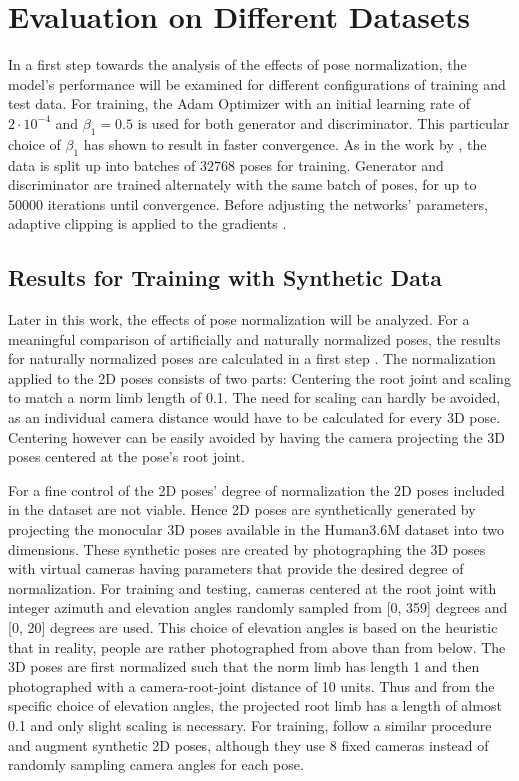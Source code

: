 \section{
	Evaluation on Different Datasets}
\label{sec:evaluation}

In a first step towards the analysis of the effects of pose normalization, the model's performance will be examined for different configurations of training and test data.
For training, the Adam Optimizer \cite{kingma17} with an initial learning rate of $2 \cdot 10^{-4}$ and $\beta_1 = 0.5$ is used for both generator and discriminator.
This particular choice of $\beta_1$ has shown to result in faster convergence.
As in the work by \citet{drover18}, the data is split up into batches of $32768$ poses for training.
Generator and discriminator are trained alternately with the same batch of poses, for up to $50000$ iterations until convergence.
Before adjusting the networks' parameters, adaptive clipping is applied to the gradients \cite[Section~3.2.1]{chorowski14}.


\subsection{Results for Training with Synthetic Data}

Later in this work, the effects of pose normalization will be analyzed.
For a meaningful comparison of artificially and naturally normalized poses, the results for naturally normalized poses are calculated in a first step .
The normalization applied to the 2D poses consists of two parts: Centering the root joint and scaling to match a norm limb length of 0.1.
The need for scaling can hardly be avoided, as an individual camera distance would have to be calculated for every 3D pose.
Centering however can be easily avoided by having the camera projecting the 3D poses centered at the pose's root joint.

For a fine control of the 2D poses' degree of normalization the 2D poses included in the dataset are not viable.
Hence 2D poses are synthetically generated by projecting the monocular 3D poses available in the Human3.6M dataset into two dimensions.
These synthetic poses are created by photographing the 3D poses with virtual cameras having parameters that provide the desired degree of normalization.
For training and testing, cameras centered at the root joint with integer azimuth and elevation angles randomly sampled from [0, 359] degrees and [0, 20] degrees are used.
This choice of elevation angles is based on the heuristic that in reality, people are rather photographed from above than from below.
The 3D poses are first normalized such that the norm limb has length 1 and then photographed with a camera-root-joint distance of 10 units.
Thus and from the specific choice of elevation angles, the projected root limb has a length of almost 0.1 and only slight scaling is necessary.
For training, \citet{drover18} follow a similar procedure and augment synthetic 2D poses, although they use 8 fixed cameras instead of randomly sampling camera angles for each pose.

